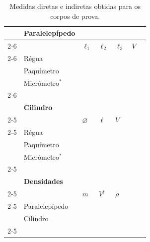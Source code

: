 \begin{table}[!htpb]
	\label{Tab:DadosMedidasCorposSolidos}
	\begin{center}
	\begin{tabular}{clp{25mm}p{25mm}p{25mm}p{25mm}c}
	\toprule
		&\textbf{Paralelepípedo}\\
		\cmidrule{2-6}
		&& $\ell_1$ & $\ell_2$ & $\ell_3$ & $V$ & \\
		\cmidrule{2-6}	
		&\cellcolor[gray]{0.89}Régua & \cellcolor[gray]{0.92} & \cellcolor[gray]{0.89} & \cellcolor[gray]{0.92} & \cellcolor[gray]{0.89}\\
		&\cellcolor[gray]{0.95}Paquímetro & \cellcolor[gray]{0.97} & \cellcolor[gray]{0.95} & \cellcolor[gray]{0.97} & \cellcolor[gray]{0.95}\\
		&\cellcolor[gray]{0.89}Micrômetro$^*$ & \cellcolor[gray]{0.92} & \cellcolor[gray]{0.89} & \cellcolor[gray]{0.92} & \cellcolor[gray]{0.89}\\
		\cmidrule{2-6}
\\
		&\textbf{Cilindro} \\
		\cmidrule{2-5}
		&& $\diameter$ & $\ell$ & $V$  \\
		\cmidrule{2-5}
		&\cellcolor[gray]{0.89}Régua & \cellcolor[gray]{0.92} & \cellcolor[gray]{0.89} & \cellcolor[gray]{0.92} \\
		&\cellcolor[gray]{0.95}Paquímetro & \cellcolor[gray]{0.97} & \cellcolor[gray]{0.95} & \cellcolor[gray]{0.97} \\
		&\cellcolor[gray]{0.89}Micrômetro$^*$ & \cellcolor[gray]{0.92} & \cellcolor[gray]{0.89} & \cellcolor[gray]{0.92} \\
		\cmidrule{2-5}
\\
		&\textbf{Densidades}\\
		\cmidrule{2-5}
		&& $m$ & $V^\dagger$ & $\rho$ \\
		\cmidrule{2-5}
		&\cellcolor[gray]{0.89}Paralelepípedo & \cellcolor[gray]{0.92} & \cellcolor[gray]{0.89} & \cellcolor[gray]{0.92} \\
		&\cellcolor[gray]{0.95}Cilindro & \cellcolor[gray]{0.97} & \cellcolor[gray]{0.95} & \cellcolor[gray]{0.97} \\
		\cmidrule{2-5}
	\bottomrule
	\end{tabular}
	\end{center}
	\caption{Medidas diretas e indiretas obtidas para os corpos de prova.}
\end{table}

\vspace{2cm}


